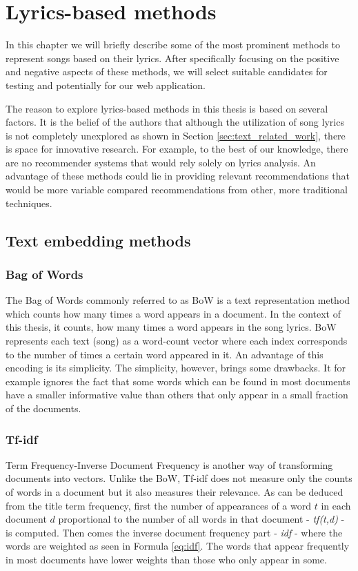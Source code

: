 \chapter{Lyrics-based methods}\label{chap:lyrics_methods}
 In this chapter we will briefly describe some of the most prominent methods to represent songs based on their lyrics. After specifically focusing on the positive and negative aspects of these methods, we will select suitable candidates for testing and potentially for our web application.
 
 The reason to explore lyrics-based methods in this thesis is based on several factors. It is the belief of the authors that although the utilization of song lyrics is not completely unexplored as shown in Section \ref{sec:text_related_work}, there is space for innovative research. For example, to the best of our knowledge, there are no recommender systems that would rely solely on lyrics analysis. An advantage of these methods could lie in providing relevant recommendations that would be more variable compared recommendations from other, more traditional techniques.

\section{Text embedding methods}
\subsection{Bag of Words}
The Bag of Words commonly referred to as BoW is a text representation method which counts how many times a word appears in a document. In the context of this thesis, it counts, how many times a word appears in the song lyrics.
BoW represents each text (song) as a word-count vector where each index corresponds to the number of times a certain word appeared in it. An advantage of this encoding is its simplicity. The simplicity, however, brings some drawbacks. It for example ignores the fact that some words which can be found in most documents have a smaller informative value than others that only appear in a small fraction of the documents. 

\subsection{Tf-idf}
Term Frequency-Inverse Document Frequency is another way of transforming documents into vectors. Unlike the BoW, Tf-idf does not measure only the counts of words in a document but it also measures their relevance. As can be deduced from the title term frequency, first the number of appearances of a word $t$ in each document $d$ proportional to the number of all words in that document - \textit{tf(t,d)} - is computed. Then comes the inverse document frequency part - \textit{idf} - where the words are weighted as seen in Formula \ref{eq:idf}. The words that appear frequently in most documents have lower weights than those who only appear in some.

